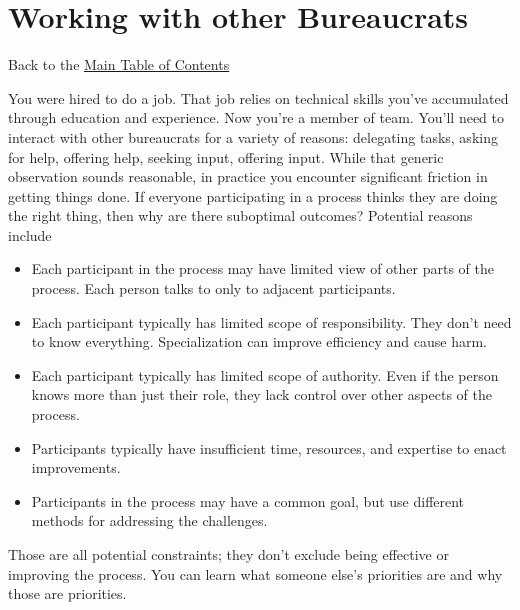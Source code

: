 \chapter{Working with other Bureaucrats\label{sec:working-with-other-bureaucrats}}
{\footnotesize Back to the \hyperref[sec:toc]{Main Table of Contents}}
\minitoc 

You were hired to do a job. That job relies on technical skills you've accumulated through education and experience. Now you're a member of team. You'll need to interact with other bureaucrats for a variety of reasons:
delegating tasks, asking for help, offering help, seeking input, offering input.
While that generic observation sounds reasonable, in practice you encounter significant friction in getting things done. 
If everyone participating in a process thinks they are doing the right thing, then why are there suboptimal outcomes? Potential reasons include
\begin{itemize}
    \item Each participant in the process may have limited view of other parts of the process. Each person talks to only to adjacent participants.
    \item Each participant typically has limited scope of responsibility. They don't need to know everything. Specialization can improve efficiency and cause harm.
    \item Each participant typically has limited scope of authority. Even if the person knows more than just their role, they lack control over other aspects of the process.
    \item Participants typically have insufficient time, resources, and expertise to enact improvements.
    \item Participants in the process may have a common goal, but use different methods for addressing the challenges.
\end{itemize}
Those are all potential constraints; they don't exclude being effective or improving the process. 
You can learn what someone else's priorities are and why those are priorities.

